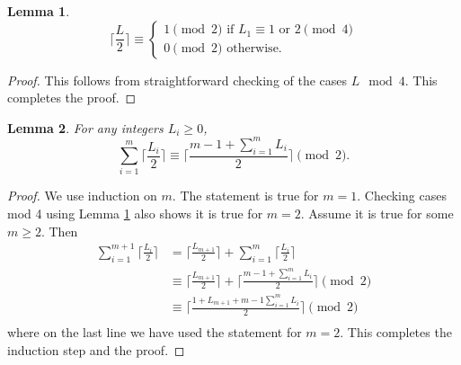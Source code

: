 \documentclass[11pt, oneside]{article}   	%
\newtheorem{lemma}{Lemma}
\begin{document}
\begin{lemma} \label{l ceil mod 4}
\[
\lceil \frac{L}{2}\rceil \equiv \begin{cases} 1 \pmod 2 \text{ if } L_1 \equiv 1 \text{ or } 2 \pmod 4\\ 
0 \pmod 2 \text{ otherwise.}
\end{cases}
\]
\end{lemma}
\begin{proof} 
This follows from straightforward checking of the cases $L \mod 4$. This completes the proof.  
\end{proof} 

\begin{lemma} \label{l add ceils}
For any integers $L_i \geq 0$,
\[
\sum_{i=1}^m \lceil \frac{L_i}{2}\rceil \equiv \lceil \frac{m-1+\sum_{i=1}^m L_i}{2}\rceil  \pmod 2. 
\] 
\end{lemma}

\begin{proof} 
We use induction on $m$. The statement is true for $m=1$. Checking cases mod 4 using Lemma \ref{l ceil mod 4} also shows it is true for $m=2$. Assume it is true for some $m \geq 2$. Then 
\begin{align*} 
\sum_{i=1}^{m+1} \lceil \frac{L_i}{2}\rceil &=  \lceil \frac{L_{m+1}}{2}\rceil +\sum_{i=1}^m \lceil \frac{L_i}{2}\rceil \\ 
&\equiv \lceil \frac{L_{m+1}}{2}\rceil +\lceil \frac{m-1+\sum_{i=1}^m L_i}{2}\rceil \pmod 2\\
&\equiv  \lceil \frac{1+L_{m+1} +m-1 \sum_{i=1}^m L_i}{2}\rceil \pmod 2\\
\end{align*}
where on the last line we have used the statement for $m=2$. This completes the induction step and the proof. 
\end{proof}
\end{document}
